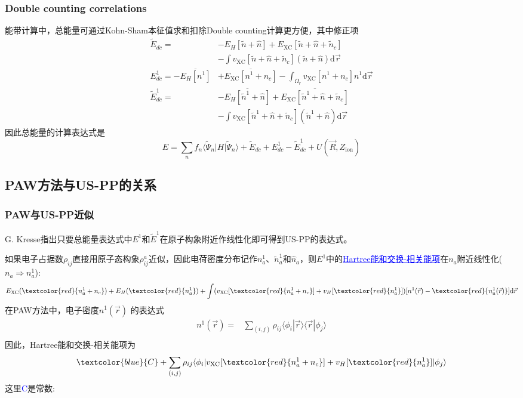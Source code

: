 {\frame
{
	\frametitle{\textrm{Double counting correlations}}
	能带计算中，总能量可通过\textrm{Kohn-Sham}本征值求和扣除\textrm{Double counting}计算更方便，其中修正项
	\begin{displaymath}
		\begin{aligned}
			\tilde E_{dc}=&-E_H[\tilde n+\hat n]+E_{\mathrm{XC}}[\tilde n+\hat n+\tilde n_c]\\
			&-\int v_{\mathrm{XC}}[\tilde n+\hat n+\tilde n_c](\tilde n+\hat n)\mathrm{d}\vec r\\
			E_{dc}^1=-\overline{E_H[n^1]}&+\overline{E_{\mathrm{XC}}[n^1+n_c]}-\int_{\Omega_r}v_{\mathrm{XC}}[n^1+n_c]n^1\mathrm{d}\vec r\\
			\tilde E_{dc}^1=&-\overline{E_H[\tilde n^1+\hat n]}+\overline{E_{\mathrm{XC}}[\tilde n^1+\hat n+\tilde n_c]}\\
			&-\int v_{\mathrm{XC}}[\tilde n^1+\hat n+\tilde n_c](\tilde n^1+\hat n)\mathrm{d}\vec r
		\end{aligned}
	\end{displaymath}
	因此总能量的计算表达式是
	$$E=\sum_nf_n\langle\tilde\Psi_n|H|\tilde\Psi_n\rangle+\tilde E_{dc}+E_{dc}^1-\tilde E_{dc}^1+U(\vec R,Z_{\mathrm{ion}})$$
}

\subsection{\rm{PAW}方法与\rm{US-PP}的关系}
\frame
{
	\frametitle{\textrm{PAW}与\textrm{US-PP}近似}
	\textrm{G. Kresse}指出只要总能量表达式中$E^1$和$\tilde E^1$在原子构象附近作线性化即可得到\textrm{US-PP}的表达式。
	
	如果电子占据数$\rho_{ij}$直接用原子态构象$\rho_{ij}^a$近似，因此电荷密度分布记作$n_a^1$、$\tilde n_a^1$和$\hat n_a$，则$E^1$中的\textcolor{blue}{\underline{\textrm{Hartree}能和交换-相关能项}}在$n_a$附近线性化($n_a\Rightarrow n_a^1$):
	\begin{displaymath}
		E_{\mathrm{XC}}(\textcolor{red}{n_a^1+n_c})+E_H(\textcolor{red}{n_a^1})+\int(v_{\mathrm{XC}}[\textcolor{red}{n_a^1+n_c}]+v_H[\textcolor{red}{n_a^1}])[n^1(\vec r)-\textcolor{red}{n_a^1(\vec r)}]\mathrm{d}\vec r
	\end{displaymath}
	在\textrm{PAW}方法中，电子密度$n^1(\vec r)$%
	的表达式
	\begin{displaymath}
		\begin{aligned}
			n^1(\vec r)=&\sum_{(i,j)}\rho_{ij}\langle\phi_i|\vec r\rangle\langle\vec r|\phi_j\rangle\\
		\end{aligned}
	\end{displaymath}
	因此，\textrm{Hartree}能和交换-相关能项为
	$$\textcolor{blue}{C}+\sum_{(i,j)}\rho_{ij}\langle\phi_i|v_{\mathrm{XC}}[\textcolor{red}{n_a^1+n_c}]+v_H[\textcolor{red}{n_a^1}]|\phi_j\rangle$$
	这里\textcolor{blue}{\textrm{C}}是常数:~{\fontsize{7.1pt}{3.9pt}}
}

}
